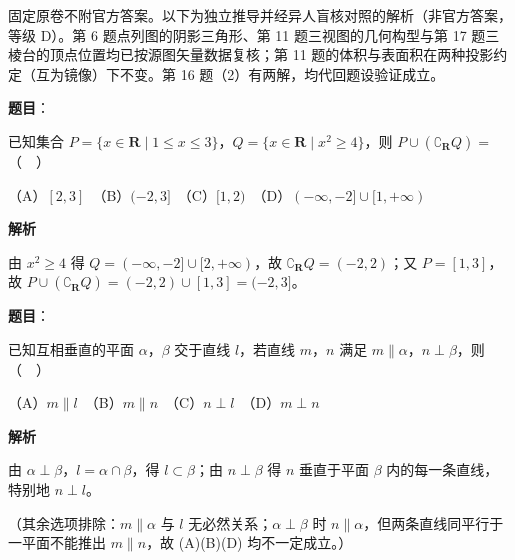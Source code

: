 

\begin{gktip}
固定原卷不附官方答案。以下为独立推导并经异人盲核对照的解析（非官方答案，等级 D）。第 6 题点列图的阴影三角形、第 11 题三视图的几何构型与第 17 题三棱台的顶点位置均已按源图矢量数据复核；第 11 题的体积与表面积在两种投影约定（互为镜像）下不变。第 16 题（2）有两解，均代回题设验证成立。
\end{gktip}

\begin{answer}

\textbf{题目}：

已知集合 \(P=\{x\in\mathbf{R}\mid 1\leqslant x\leqslant 3\}\)，\(Q=\{x\in\mathbf{R}\mid x^{2}\geqslant 4\}\)，则 \(P\cup(\complement_{\mathbf{R}}Q)=\)（　）

（A）\([2,3]\)　（B）\((-2,3]\)　（C）\([1,2)\)　（D）\((-\infty,-2]\cup[1,+\infty)\)

\textbf{解析}

由 \(x^{2}\geqslant 4\) 得 \(Q=(-\infty,-2]\cup[2,+\infty)\)，故 \(\complement_{\mathbf{R}}Q=(-2,2)\)；又 \(P=[1,3]\)，故 \(P\cup(\complement_{\mathbf{R}}Q)=(-2,2)\cup[1,3]=(-2,3]\)。

\gkanswer{答案：B，\((-2,3]\)}

\end{answer}
\begin{answer}

\textbf{题目}：

已知互相垂直的平面 \(\alpha\)，\(\beta\) 交于直线 \(l\)，若直线 \(m\)，\(n\) 满足 \(m\parallel\alpha\)，\(n\perp\beta\)，则（　）

（A）\(m\parallel l\)　（B）\(m\parallel n\)　（C）\(n\perp l\)　（D）\(m\perp n\)

\textbf{解析}

由 \(\alpha\perp\beta\)，\(l=\alpha\cap\beta\)，得 \(l\subset\beta\)；由 \(n\perp\beta\) 得 \(n\) 垂直于平面 \(\beta\) 内的每一条直线，特别地 \(n\perp l\)。

（其余选项排除：\(m\parallel\alpha\) 与 \(l\) 无必然关系；\(\alpha\perp\beta\) 时 \(n\parallel\alpha\)，但两条直线同平行于一平面不能推出 \(m\parallel n\)，故 (A)(B)(D) 均不一定成立。）


\end{answer}
